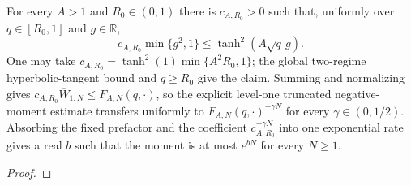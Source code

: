 \begin{lemma}
  \label{lem:gaussian-outside-coordinate-lower}
  \leanok
  For every $A>1$ and $R_0\in(0,1)$ there is $c_{A,R_0}>0$ such that,
  uniformly over $q\in[R_0,1]$ and $g\in\mathbb R$,
  \[
    c_{A,R_0}\min\{g^2,1\}
    \leq \tanh^2(A\sqrt q\,g).
  \]
  One may take
  $c_{A,R_0}=\tanh^2(1)\min\{A^2R_0,1\}$; the global two-regime
  hyperbolic-tangent bound and $q\geq R_0$ give the claim.
  Summing and normalizing gives
  $c_{A,R_0}\overline W_{1,N}\leq F_{A,N}(q,\cdot)$, so the explicit
  level-one truncated negative-moment estimate transfers uniformly to
  $F_{A,N}(q,\cdot)^{-\gamma N}$ for every $\gamma\in(0,1/2)$.
  Absorbing the fixed prefactor and the coefficient
  $c_{A,R_0}^{-\gamma N}$ into one exponential rate gives a real $b$ such
  that the moment is at most $e^{bN}$ for every $N\geq1$.
\end{lemma}
\begin{proof}\leanok\end{proof}

